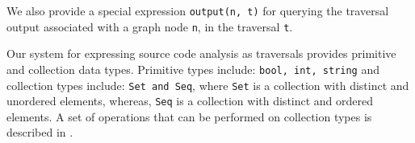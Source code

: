 We also provide a special expression \lstinline|output(n, t)| for querying the
traversal output associated with a graph node \lstinline|n|, in the traversal
\lstinline|t|.
% 
% 
% 


Our system for expressing source code analysis as traversals provides primitive and
collection data types. Primitive types include: \lstinline|bool, int, string|
and collection types include: \lstinline|Set and Seq|, where \lstinline|Set| is a
collection with distinct and unordered elements, whereas, \lstinline|Seq| is a
collection with distinct and ordered elements. A set of operations that can be
performed on collection types is described in .
% 

